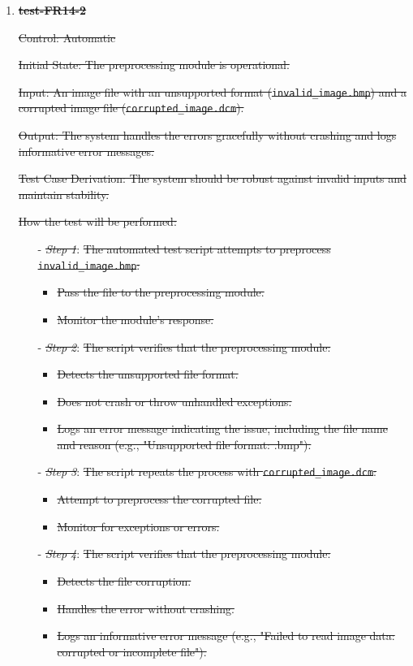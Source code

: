 \documentclass[12pt, titlepage]{article}
\begin{document}
\begin{enumerate}
\begin{enumerate}
\begin{enumerate}
\item \textbf{\sout{test-FR14-2}} \label{test-FR14-2}

\sout{Control: Automatic}

\sout{Initial State: The preprocessing module is operational.}

\sout{Input: An image file with an unsupported format (\texttt{invalid\_image.bmp}) and a corrupted image file (\texttt{corrupted\_image.dcm}).}

\sout{Output: The system handles the errors gracefully without crashing and logs informative error messages.}

\sout{Test Case Derivation: The system should be robust against invalid inputs and maintain stability.}

\sout{How the test will be performed:}

\begin{itemize}
  \item[-] \textit{\sout{Step 1}}: \sout{The automated test script attempts to preprocess \texttt{invalid\_image.bmp}:}
    \begin{itemize}
      \item \sout{Pass the file to the preprocessing module.}
      \item \sout{Monitor the module's response.}
    \end{itemize}
  \item[-] \textit{\sout{Step 2}}: \sout{The script verifies that the preprocessing module:}
    \begin{itemize}
      \item \sout{Detects the unsupported file format.}
      \item \sout{Does not crash or throw unhandled exceptions.}
      \item \sout{Logs an error message indicating the issue, including the file name and reason (e.g., "Unsupported file format: .bmp").}
    \end{itemize}
  \item[-] \textit{\sout{Step 3}}: \sout{The script repeats the process with \texttt{corrupted\_image.dcm}:}
    \begin{itemize}
      \item \sout{Attempt to preprocess the corrupted file.}
      \item \sout{Monitor for exceptions or errors.}
    \end{itemize}
  \item[-] \textit{\sout{Step 4}}: \sout{The script verifies that the preprocessing module:}
    \begin{itemize}
      \item \sout{Detects the file corruption.}
      \item \sout{Handles the error without crashing.}
      \item \sout{Logs an informative error message (e.g., "Failed to read image data: corrupted or incomplete file").}
    \end{itemize}
\end{itemize}


\end{enumerate}
\end{enumerate}
\end{enumerate}
\end{document}
